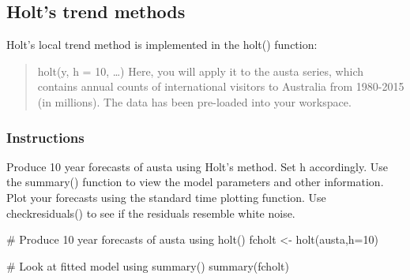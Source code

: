 \documentclass[
  letterpaper,
  DIV=11,
  numbers=noendperiod]{scrartcl}
\newenvironment{Shaded}{\begin{snugshade}}{\end{snugshade}}
\newcommand{\AttributeTok}[1]{\textcolor[rgb]{0.40,0.45,0.13}{#1}}
\newcommand{\CommentTok}[1]{\textcolor[rgb]{0.37,0.37,0.37}{#1}}
\newcommand{\DecValTok}[1]{\textcolor[rgb]{0.68,0.00,0.00}{#1}}
\newcommand{\FunctionTok}[1]{\textcolor[rgb]{0.28,0.35,0.67}{#1}}
\newcommand{\NormalTok}[1]{\textcolor[rgb]{0.00,0.23,0.31}{#1}}
\newcommand{\OtherTok}[1]{\textcolor[rgb]{0.00,0.23,0.31}{#1}}
\begin{document}
\hypertarget{holts-trend-methods}{%
\subsection{Holt's trend methods}\label{holts-trend-methods}}

Holt's local trend method is implemented in the holt() function:

\begin{quote}
holt(y, h = 10, \ldots) Here, you will apply it to the austa series,
which contains annual counts of international visitors to Australia from
1980-2015 (in millions). The data has been pre-loaded into your
workspace.
\end{quote}

\hypertarget{instructions-10}{%
\subsubsection{Instructions}\label{instructions-10}}

Produce 10 year forecasts of austa using Holt's method. Set h
accordingly. Use the summary() function to view the model parameters and
other information. Plot your forecasts using the standard time plotting
function. Use checkresiduals() to see if the residuals resemble white
noise.

\begin{Shaded}
\begin{Highlighting}[]
\CommentTok{\# Produce 10 year forecasts of austa using holt()}
\NormalTok{fcholt }\OtherTok{\textless{}{-}} \FunctionTok{holt}\NormalTok{(austa,}\AttributeTok{h=}\DecValTok{10}\NormalTok{)}

\CommentTok{\# Look at fitted model using summary()}
\FunctionTok{summary}\NormalTok{(fcholt)}
\end{Highlighting}
\end{Shaded}
\end{document}
